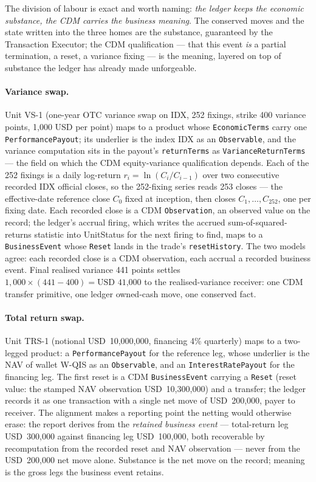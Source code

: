 \documentclass[11pt,a4paper]{article}
\newcommand{\USD}[1]{\mbox{USD~#1}}
\begin{document}
The division of labour is exact and worth naming: \emph{the ledger keeps the
economic substance, the CDM carries the business meaning}. The conserved moves
and the state written into the three homes are the substance, guaranteed by the
Transaction Executor; the CDM qualification --- that this event \emph{is} a
partial termination, a reset, a variance fixing --- is the meaning, layered on
top of substance the ledger has already made unforgeable.

\paragraph{Variance swap.} Unit VS-1 (one-year OTC variance swap on IDX, 252
fixings, strike 400 variance points, 1{,}000 USD per point) maps to a product
whose \texttt{EconomicTerms} carry one \texttt{PerformancePayout}; its underlier
is the index IDX as an \texttt{Observable}, and the variance computation sits in
the payout's \texttt{returnTerms} as \texttt{VarianceReturnTerms} --- the field on
which the CDM equity-variance qualification depends. Each of the 252 fixings is a daily log-return $r_i = \ln(C_i/C_{i-1})$ over two
consecutive recorded IDX official closes, so the 252-fixing series reads 253
closes --- the effective-date reference close $C_0$ fixed at inception, then
closes $C_1,\dots,C_{252}$, one per fixing date. Each recorded close is a CDM
\texttt{Observation}, an observed value on the record; the ledger's accrual firing, which writes the accrued
sum-of-squared-returns statistic into UnitStatus for the next firing to find,
maps to a \texttt{BusinessEvent} whose \texttt{Reset} lands in the trade's
\texttt{resetHistory}. The two models agree: each recorded close is a CDM observation, each accrual a
recorded business event. Final realised variance 441 points settles $1{,}000 \times (441-400) =
\USD{41{,}000}$ to the realised-variance receiver: one CDM transfer primitive,
one ledger owned-cash move, one conserved fact.

\paragraph{Total return swap.} Unit TRS-1 (notional \USD{10{,}000{,}000},
financing 4\% quarterly) maps to a two-legged product: a
\texttt{PerformancePayout} for the reference leg, whose underlier is the NAV of
wallet W-QIS as an \texttt{Observable}, and an \texttt{InterestRatePayout} for the
financing leg. The first reset is a CDM \texttt{BusinessEvent} carrying a
\texttt{Reset} (reset value: the stamped NAV observation \USD{10{,}300{,}000})
and a transfer; the ledger records it as one transaction with a single net move
of \USD{200{,}000}, payer to receiver. The alignment makes a reporting point the
netting would otherwise erase: the report derives from the \emph{retained
business event} --- total-return leg \USD{300{,}000} against financing leg
\USD{100{,}000}, both recoverable by recomputation from the recorded reset and
NAV observation --- never from the \USD{200{,}000} net move alone. Substance is
the net move on the record; meaning is the gross legs the business event retains.
\end{document}
